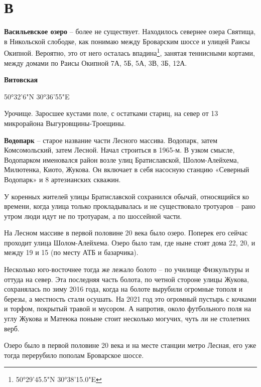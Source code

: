 \chapter*{В}

\textbf{Васильевское озеро} – более не существует. Находилось севернее озера Святища, в Никольской слободке, как понимаю между Броварским шоссе и улицей Раисы Окипной. Вероятно, это от него осталась впадина\footnote{50°29'45.5"N 30°38'15.0"E}, занятая теннисными кортами, между домами по Раисы Окипной 7А, 5Б, 5А, 3В, 3Б, 12А.\\

\medskip

\textbf{Витовская}

50°32'6"N 30°36'55"E

Урочище. Заросшее кустами поле, с остатками стариц, на север от 13 микрорайона Выгуров\-щины-Троещины.\\

\medskip

\textbf{Водопарк} – старое название части Лесного массива. Водопарк, затем Комсомольский, затем Лесной. Начал строиться в 1965-м. В узком смысле, Водопарком именовался район возле улиц Братиславской, Шолом-Алейхема, Милютенка, Киото, Жукова. Он включает в себя насосную станцию «Северный Водопарк» и 8 артезианских скважин.

У коренных жителей улицы Братиславской сохранился обычай, относящийся ко времени, когда улица только прокладывалась и не существовало тротуаров – рано утром люди идут не по тротуарам, а по шоссейной части.

На Лесном массиве в первой половине 20 века было озеро. Поперек его сейчас проходит улица Шолом-Алейхема. Озеро было там, где ныне стоят дома 22, 20, и между 19 и 15 (по месту АТБ и базарчика).

Несколько юго-восточнее тогда же лежало болото – по училище Физкультуры и оттуда на север. Эта последняя часть болота, по четной стороне улицы Жукова, сохранялась по зиму 2016 года, когда на болоте вырубили огромные тополя и березы, а местность стали осушать. На 2021 год это огромный пустырь с кочками и торфом, покрытый травой и мусором. А напротив, около футбольного поля на углу Жукова и Матеюка поныне стоит несколько могучих, чуть ли не столетних верб.

Озеро было в первой половине 20 века и на месте станции метро Лесная, его уже тогда перерубило пополам Броварское шоссе.\\

